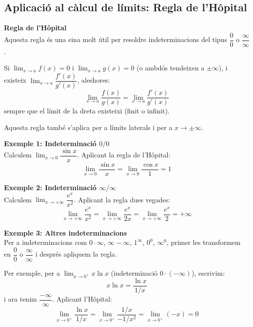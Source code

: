 \documentclass[12pt]{article}
\begin{document}
\subsection{Aplicació al càlcul de límits: Regla de l'Hôpital}

\begin{concept}
\textbf{Regla de l'Hôpital}\\
Aquesta regla és una eina molt útil per resoldre indeterminacions del tipus $\dfrac{0}{0}$ o $\dfrac{\infty}{\infty}$.

Si $\displaystyle \lim_{x\to a} f(x) = 0$ i $\displaystyle \lim_{x\to a} g(x) = 0$ (o ambdós tendeixen a $\pm\infty$), i existeix $\displaystyle \lim_{x\to a} \dfrac{f'(x)}{g'(x)}$, aleshores:
\[
\boxed{\lim_{x\to a} \dfrac{f(x)}{g(x)} = \lim_{x\to a} \dfrac{f'(x)}{g'(x)}}
\]
sempre que el límit de la dreta existeixi (finit o infinit).

Aquesta regla també s'aplica per a límits laterals i per a $x\to \pm\infty$.
\end{concept}

\begin{exemple}
\textbf{Exemple 1: Indeterminació $0/0$}\\
Calculem $\displaystyle \lim_{x\to 0} \dfrac{\sin x}{x}$.
Aplicant la regla de l'Hôpital:
\[
\lim_{x\to 0} \dfrac{\sin x}{x} = \lim_{x\to 0} \dfrac{\cos x}{1} = 1
\]
\end{exemple}

\begin{exemple}
\textbf{Exemple 2: Indeterminació $\infty/\infty$}\\
Calculem $\displaystyle \lim_{x\to +\infty} \dfrac{e^x}{x^2}$.
Aplicant la regla dues vegades:
\[
\lim_{x\to +\infty} \dfrac{e^x}{x^2} = \lim_{x\to +\infty} \dfrac{e^x}{2x} = \lim_{x\to +\infty} \dfrac{e^x}{2} = +\infty
\]
\end{exemple}

\begin{exemple}
\textbf{Exemple 3: Altres indeterminacions}\\
Per a indeterminacions com $0\cdot\infty$, $\infty-\infty$, $1^\infty$, $0^0$, $\infty^0$, primer les transformem en $\dfrac{0}{0}$ o $\dfrac{\infty}{\infty}$ i després apliquem la regla.

Per exemple, per a $\displaystyle \lim_{x\to 0^+} x\ln x$ (indeterminació $0\cdot(-\infty)$), escrivim:
\[
x\ln x = \dfrac{\ln x}{1/x}
\]
i ara tenim $\dfrac{-\infty}{\infty}$. Aplicant l'Hôpital:
\[
\lim_{x\to 0^+} \dfrac{\ln x}{1/x} = \lim_{x\to 0^+} \dfrac{1/x}{-1/x^2} = \lim_{x\to 0^+} (-x) = 0
\]
\end{exemple}
\end{document}
